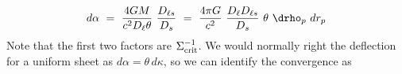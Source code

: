 \begin{equation}
  d\alpha \ =\ \frac{4GM}{c^2 D_\ell \theta}\ \frac{D_{\ell s}}{D_s}
  \ =\ \frac{4\pi G}{c^2}\ \frac{D_\ell D_{\ell s}}{D_s}\ \theta\ \drho_p\ dr_p
\end{equation}
Note that the first two factors are $\Sigma_{\rm crit}^{-1}$.  We would normally right the deflection for a uniform sheet as $d\alpha = \theta\,d\kappa$, so we can identify the convergence as